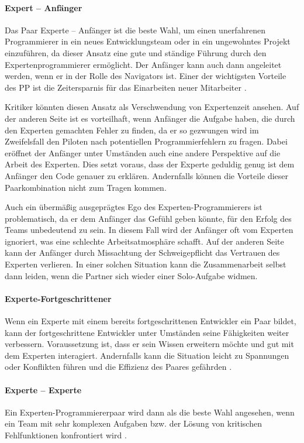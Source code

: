 \paragraph {Expert – Anfänger} Das Paar Experte – Anfänger ist die beste Wahl, um einen unerfahrenen Programmierer in ein neues Entwicklungsteam oder in ein ungewohntes Projekt einzuführen, da dieser Ansatz eine gute und ständige Führung durch den Expertenprogrammierer ermöglicht. Der Anfänger kann auch dann angeleitet werden, wenn er in der Rolle des Navigators ist. Einer der wichtigsten Vorteile des PP ist die Zeitersparnis für das Einarbeiten neuer Mitarbeiter \cite{Alshehri2014RankingProgramming}.


Kritiker könnten diesen Ansatz als Verschwendung von Expertenzeit ansehen. Auf der anderen Seite ist es vorteilhaft, wenn Anfänger die Aufgabe haben, die durch den Experten gemachten Fehler zu finden, da er so gezwungen wird im Zweifelsfall den Piloten nach potentiellen Programmierfehlern zu fragen. Dabei eröffnet der Anfänger unter Umständen auch eine andere Perspektive auf die Arbeit des Experten. Dies setzt voraus, dass der Experte geduldig genug ist dem Anfänger den Code genauer zu erklären. Andernfalls können die Vorteile dieser Paarkombination nicht zum Tragen kommen.

Auch ein übermäßig ausgeprägtes Ego des Experten-Programmierers ist problematisch, da er dem Anfänger das Gefühl geben könnte, für den Erfolg des Teams unbedeutend zu sein. In diesem Fall wird der Anfänger oft vom Experten ignoriert, was eine schlechte Arbeitsatmosphäre schafft. Auf der anderen Seite kann der Anfänger durch Missachtung der Schweigepflicht das Vertrauen des Experten verlieren. In einer solchen Situation kann die Zusammenarbeit selbst dann leiden, wenn die Partner sich wieder einer Solo-Aufgabe widmen.

\paragraph{ Experte-Fortgeschrittener}
Wenn ein Experte mit einem bereits fortgeschrittenen Entwickler ein Paar bildet, kann der fortgeschrittene Entwickler unter Umständen seine Fähigkeiten weiter verbessern. Voraussetzung ist, dass er sein Wissen erweitern möchte und gut mit dem Experten interagiert. Andernfalls kann die Situation leicht zu Spannungen oder Konflikten führen und die Effizienz des Paares gefährden \cite{Alshehri2014RankingProgramming}.

\paragraph {Experte – Experte} Ein Experten-Programmiererpaar wird dann als die beste Wahl angesehen, wenn ein Team mit sehr komplexen Aufgaben bzw. der Lösung von kritischen Fehlfunktionen konfrontiert wird \cite{Alshehri2014RankingProgramming}.



